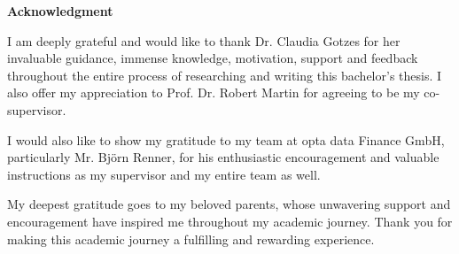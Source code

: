 \begin{center}
    \Large\textbf{Acknowledgment}
\end{center}\vspace{1cm}
\normalsize
I am deeply grateful and would like to thank Dr. Claudia Gotzes for her invaluable guidance, immense knowledge, motivation, support and feedback throughout the entire process of researching and writing this bachelor’s thesis. I also offer my appreciation to Prof. Dr. Robert Martin for agreeing to be my co-supervisor.\vspace{.4cm}

I would also like to show my gratitude to my team at opta data Finance GmbH, particularly Mr. Björn Renner, for his enthusiastic encouragement and valuable instructions as my supervisor and my entire team as well.\vspace{.4cm}

My deepest gratitude goes to my beloved parents, whose unwavering support and
encouragement have inspired me throughout my academic journey. Thank you for making this academic journey a fulfilling and rewarding experience.
